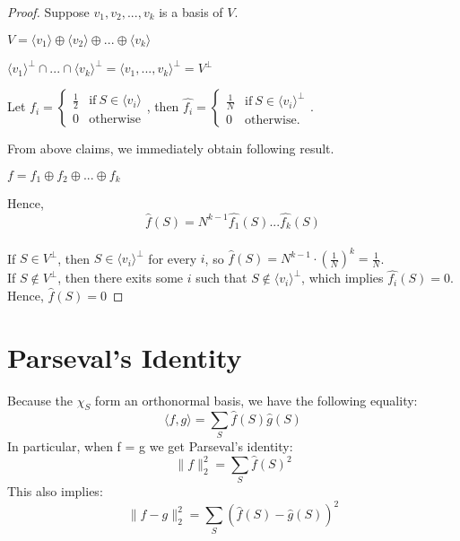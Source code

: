 \begin{proof}
Suppose $v_1, v_2,..., v_k $ is a basis of $V$.

\begin{claim}
$V = \langle v_1 \rangle \oplus \langle v_2 \rangle 
	 \oplus ... \oplus \langle v_k \rangle $
\end{claim}

\begin{claim}
${\langle v_1 \rangle}^\perp \cap ... \cap {\langle v_k \rangle}^\perp
= {\langle v_1, ..., v_k \rangle}^\perp = V^\perp$
\end{claim}

\noindent Let $f_i = \begin{cases}
	\frac{1}{2} & \text{if} \ S \in \langle v_i \rangle \\
	0             & \text{otherwise}
\end{cases}$, 
then $\widehat{f_i} = \begin{cases}
	\frac{1}{N} & \text{if} \ S \in {\langle v_i \rangle}^ \perp \\
	0             & \text{otherwise}.
\end{cases}$. 

\noindent From above claims, we immediately obtain following result.
\begin{claim}
$f = f_1 \oplus f_2 \oplus ... \oplus f_k$
\end{claim}

\noindent Hence,
$$\widehat{f}(S) = N^{k-1} \widehat{f_1}(S) ... \widehat{f_k}(S)$$ \\
If $S \in V^\perp$, then $S \in {\langle v_i \rangle}^\perp$ for every $i$, so $\widehat{f}(S) = N^{k-1} \cdot (\frac{1}{N})^k = \frac{1}{N}$. \\
If $S \not\in V^\perp$, then there exits some $i$ such that $S \not\in {\langle v_i \rangle}^\perp$, which implies $\widehat{f_i}(S) = 0$. Hence, $\widehat{f}(S) = 0$
\end{proof}

\section{Parseval's Identity}
Because the $\chi_S$ form an orthonormal basis, we have the following equality:
\begin{equation}
\langle f, g \rangle = \sum\limits_{S} \widehat{f}(S) \widehat{g}(S)
\end{equation}
In particular, when f = g we get Parseval's identity:
\begin{equation}
\| f \|_2^2 = \sum\limits_{S} \widehat{f}(S)^2
\end{equation}
This also implies:
\begin{equation}
\| f - g \|_2^2 = \sum\limits_{S} (\widehat{f}(S) - \widehat{g}(S))^2
\end{equation}


